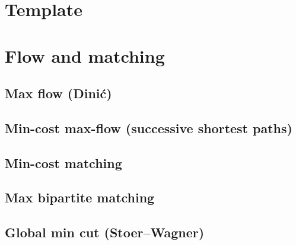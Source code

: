 \documentclass[9pt]{extarticle}
\begin{document}
\begin{multicols*}{3}
\setlength{\parskip}{0.0in}
\tableofcontents
\setlength{\parskip}{0.1in}

\section{Template}


\section{Flow and matching}

\subsection{Max flow (Dini\'c)} %


\subsection{Min-cost max-flow (successive shortest paths)}


\subsection{Min-cost matching} %


\subsection{Max bipartite matching} %


\subsection{Global min cut (Stoer--Wagner)} %



\end{multicols*}
\end{document}
